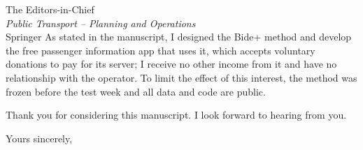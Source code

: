 \documentclass[11pt,a4paper]{letter}
\begin{document}
\begin{letter}{The Editors-in-Chief\\\emph{Public Transport -- Planning and Operations}\\Springer}
As stated in the manuscript, I designed the Bide+ method and develop the free passenger information app that uses it,
which accepts voluntary donations to pay for its server; I receive no other income from it and have no relationship with
the operator. To limit the effect of this interest, the method was frozen before the test week and all data and code are
public.

Thank you for considering this manuscript. I look forward to hearing from you.

\closing{Yours sincerely,}

\end{letter}
\end{document}
